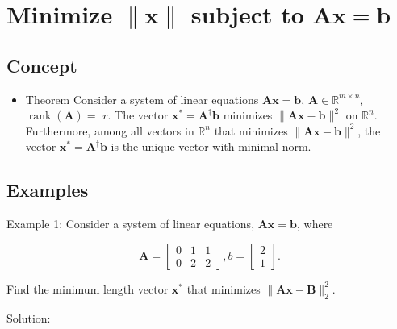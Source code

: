 \section{Minimize \(\|\boldsymbol{x}\|\) subject to \(\boldsymbol{A} \boldsymbol{x}=\boldsymbol{b}\)}

\subsection{Concept}
\begin{itemize}
	\item Theorem  Consider a system of linear equations \(\boldsymbol{A} \boldsymbol{x}=\boldsymbol{b}\), \(\boldsymbol{A} \in \mathbb{R}^{m \times n}\), \(\operatorname{rank}(\boldsymbol{A})=\) \(r\). The vector \(\boldsymbol{x}^{*}=\boldsymbol{A}^{\dagger} \boldsymbol{b}\) minimizes \(\|\boldsymbol{A} \boldsymbol{x}-\boldsymbol{b}\|^{2}\) on \(\mathbb{R}^{n}\). Furthermore, among all vectors in \(\mathbb{R}^{n}\) that minimizes \(\|\boldsymbol{A} \boldsymbol{x}-\boldsymbol{b}\|^{2}\), the vector \(\boldsymbol{x}^{*}=\boldsymbol{A}^{\dagger} \boldsymbol{b}\) is the unique vector with minimal norm.
\end{itemize}

\subsection{Examples}
Example 1: Consider a system of linear equations, \(\boldsymbol{A} \boldsymbol{x}=\boldsymbol{b}\), where

\[
	\boldsymbol{A}=\left[\begin{array}{lll}
		0 & 1 & 1 \\
		0 & 2 & 2
	\end{array}\right], b=\left[\begin{array}{l}
		2 \\
		1
	\end{array}\right] .
\]

Find the minimum length vector \(\boldsymbol{x}^{*}\) that minimizes \(\|\boldsymbol{A} \boldsymbol{x}-\boldsymbol{B}\|_{2}^{2}\).

Solution:

